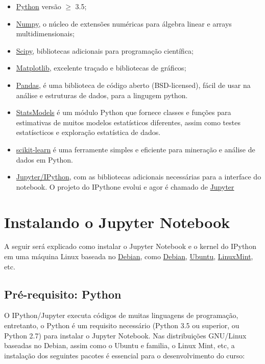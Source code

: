 \documentclass[11pt]{article}
\providecommand{\tightlist}{%
      \setlength{\itemsep}{0pt}\setlength{\parskip}{0pt}}
\begin{document}
\begin{itemize}
\tightlist
\item
  \href{http://www.python.org}{Python} versão \(\ge\) 3.5;
\item
  \href{http://www.numpy.org}{Numpy}, o núcleo de extensões numéricas
  para álgebra linear e arrays multidimensionais;
\item
  \href{http://www.scipy.org}{Scipy}, bibliotecas adicionais para
  programação científica;
\item
  \href{http://matplotlib.sf.net}{Matplotlib}, excelente traçado e
  bibliotecas de gráficos;
\item
  \href{http://pandas.pydata.org/}{Pandas}, é uma biblioteca de código
  aberto (BSD-licensed), fácil de usar na análise e estruturas de dados,
  para a lingugem python.
\item
  \href{http://www.statsmodels.org/stable/index.html}{StatsModels} é um
  módulo Python que fornece classes e funções para estimativas de muitos
  modelos estatísticos diferentes, assim como testes estatíscticos e
  exploração estatística de dados.
\item
  \href{http://scikit-learn.org/stable/}{scikit-learn} é uma ferramente
  simples e eficiente para mineração e análise de dados em Python.
\item
  \href{http://ipython.org}{Jupyter/IPython}, com as bibliotecas
  adicionais necessárias para a interface do notebook. O projeto do
  IPythone evolui e agor é chamado de \href{http://jupyter.org}{Jupyter}
\end{itemize}

\section{Instalando o Jupyter
Notebook}\label{instalando-o-jupyter-notebook}

A seguir será explicado como instalar o Jupyter Notebook e o kernel do
IPython em uma máquina Linux baseada no
\href{http://www.debian.org/}{Debian}, como
\href{http://www.debian.org/}{Debian},
\href{https://www.ubuntu.com/}{Ubuntu},
\href{https://linuxmint.com/}{LinuxMint}, etc.

\subsection{Pré-requisito: Python }\label{pruxe9-requisito-python}

O IPython/Jupyter executa códigos de muitas linguagens de programação,
entretanto, o Python é um requisito necessário (Python 3.5 ou superior,
ou Python 2.7) para instalar o Jupyter Notebook. Nas distribuições
GNU/Linux baseadas no Debian, assim como o Ubuntu e familia, o Linux
Mint, etc, a instalação dos seguintes pacotes é essencial para o
desenvolvimento do curso:
\end{document}
